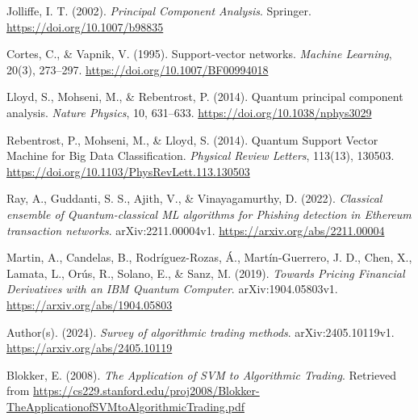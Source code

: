 \documentclass[journal]{IEEEtran}
\begin{document}
\begin{thebibliography}{99}

Jolliffe, I. T. (2002). \textit{Principal Component Analysis}. Springer. \url{https://doi.org/10.1007/b98835}

Cortes, C., \& Vapnik, V. (1995). Support-vector networks. \textit{Machine Learning}, 20(3), 273–297. \url{https://doi.org/10.1007/BF00994018}

Lloyd, S., Mohseni, M., \& Rebentrost, P. (2014). Quantum principal component analysis. \textit{Nature Physics}, 10, 631–633. \url{https://doi.org/10.1038/nphys3029}

Rebentrost, P., Mohseni, M., \& Lloyd, S. (2014). Quantum Support Vector Machine for Big Data Classification. \textit{Physical Review Letters}, 113(13), 130503. \url{https://doi.org/10.1103/PhysRevLett.113.130503}

Ray, A., Guddanti, S. S., Ajith, V., \& Vinayagamurthy, D. (2022). \textit{Classical ensemble of Quantum-classical ML algorithms for Phishing detection in Ethereum transaction networks}. arXiv:2211.00004v1. \url{https://arxiv.org/abs/2211.00004}

Martin, A., Candelas, B., Rodríguez-Rozas, Á., Martín-Guerrero, J. D., Chen, X., Lamata, L., Orús, R., Solano, E., \& Sanz, M. (2019). \textit{Towards Pricing Financial Derivatives with an IBM Quantum Computer}. arXiv:1904.05803v1. \url{https://arxiv.org/abs/1904.05803}

Author(s). (2024). \textit{Survey of algorithmic trading methods}. arXiv:2405.10119v1. \url{https://arxiv.org/abs/2405.10119}

Blokker, E. (2008). \textit{The Application of SVM to Algorithmic Trading}. Retrieved from \url{https://cs229.stanford.edu/proj2008/Blokker-TheApplicationofSVMtoAlgorithmicTrading.pdf}

\end{thebibliography}
\end{document}
